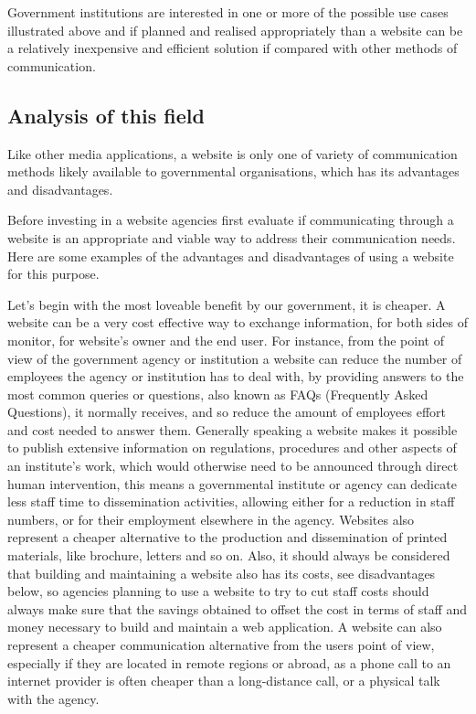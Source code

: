 Government institutions are interested in one or more of the possible use cases illustrated above and if planned and realised appropriately than a website can be a relatively inexpensive and efficient solution if compared with other methods of communication.

\subsection{Analysis of this field}
Like other media applications, a website is only one of variety of communication methods likely available to governmental organisations, which has its advantages and disadvantages.

Before investing in a website agencies first evaluate if communicating through a website is an appropriate and viable way to address their communication needs. Here are some examples of the advantages and disadvantages of using a website for this purpose.

Let’s begin with the most loveable benefit by our government, it is cheaper. A website can be a very cost effective way to exchange information, for both sides of monitor, for website’s owner and the end user. For instance, from the point of view of the government agency or institution a website can reduce the number of employees the agency or institution has to deal with, by providing answers to the most common queries or questions, also known as FAQs (Frequently Asked Questions), it normally receives, and so reduce the amount of employees effort and cost needed to answer them. Generally speaking a website makes it possible to publish extensive information on regulations, procedures and other aspects of an institute's work, which would otherwise need to be announced through direct human intervention, this means a governmental institute or agency can dedicate less staff time to dissemination activities, allowing either for a reduction in staff numbers, or for their employment elsewhere in the agency. Websites also represent a cheaper alternative to the production and dissemination of printed materials, like brochure, letters and so on. Also, it should always be considered that building and maintaining a website also has its costs, see disadvantages below, so agencies planning to use a website to try to cut staff costs should always make sure that the savings obtained to offset the cost in terms of staff and money necessary to build and maintain a web application. A website can also represent a cheaper communication alternative from the users point of view, especially if they are located in remote regions or abroad, as a phone call to an internet provider is often cheaper than a long-distance call, or a physical talk with the agency.

